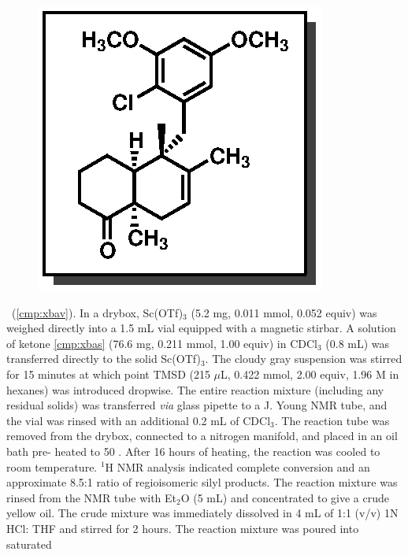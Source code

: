 \vspace{10pt}
\begin{figure}
  \vspace{-25pt}
  \begin{center}
    \includegraphics[scale=0.8]{chp_singlecarbon/images/xbav}
  \end{center}
  \vspace{-30pt}
\end{figure}\noindent \textbf{\CMPxbav}\ (\ref{cmp:xbav}). In a drybox, Sc(OTf)$_3$ (5.2 mg,
0.011 mmol, 0.052 equiv) was weighed directly into a 1.5 mL vial equipped with a
magnetic stirbar. A solution of ketone \ref{cmp:xbas} (76.6 mg, 0.211 mmol,
1.00 equiv) in CDCl$_3$ (0.8 mL) was transferred directly to the solid
Sc(OTf)$_3$. The cloudy gray suspension was stirred for 15 minutes at which
point TMSD (215 $\mu$L, 0.422 mmol, 2.00 equiv, 1.96 M in hexanes) was introduced dropwise. The
entire reaction mixture (including any residual solids) was transferred \textit{via} glass pipette
to a J.
Young NMR tube, and the vial was rinsed with an additional 0.2 mL of CDCl$_3$. The reaction tube
was removed from the drybox, connected to a nitrogen manifold, and placed in an oil bath pre-
heated to 50 \degc. After 16 hours of heating, the reaction was cooled to room temperature. $^1$H
NMR analysis indicated complete conversion and an approximate 8.5:1 ratio of regioisomeric silyl
products. The reaction mixture was rinsed from the NMR tube with Et$_2$O (5 mL) and
concentrated to give a crude yellow oil. The crude mixture was immediately dissolved in 4 mL of
1:1 (v/v) 1N HCl: THF and stirred for 2 hours. The reaction mixture was poured into saturated

